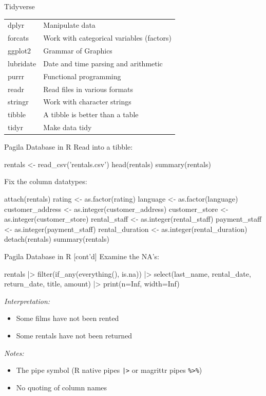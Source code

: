 \documentclass[ignorenonframetext,xcolor=x11names]{beamer}
\begin{document}
\begin{frame}{Tidyverse}
\renewcommand{\arraystretch}{1.25}
\centering

\begin{tabular}{l|l} \hline
dplyr & Manipulate data \\
forcats & Work with categorical variables (factors) \\
ggplot2 & Grammar of Graphics \\
lubridate & Date and time parsing and arithmetic \\
purrr & Functional programming \\
readr & Read files in various formats \\
stringr & Work with character strings \\
tibble & A tibble is better than a table \\
tidyr & Make data tidy \\ \hline
\end{tabular}
\end{frame}

\begin{frame}[fragile]{Pagila Database in R}
Read into a tibble:
\small
\begin{Rcode}
rentals <- read_csv('rentals.csv')
head(rentals)
summary(rentals)
\end{Rcode}
Fix the column datatypes:
\footnotesize
\begin{Rcode}
attach(rentals)
rating <- as.factor(rating)
language <- as.factor(language)
customer_address <- as.integer(customer_address)
customer_store <- as.integer(customer_store)
rental_staff <- as.integer(rental_staff)
payment_staff <- as.integer(payment_staff)
rental_duration <- as.integer(rental_duration)
detach(rentals)
summary(rentals)
\end{Rcode}
\end{frame}

\begin{frame}[fragile]{Pagila Database in R \small [cont'd]}
Examine the NA's:
\footnotesize
\begin{Rcode}
rentals |> 
  filter(if_any(everything(), is.na)) |>
  select(last_name, rental_date, return_date, 
         title, amount) |>
  print(n=Inf, width=Inf)
\end{Rcode}
\normalsize
\emph{Interpretation:}
\begin{itemize}
  \item Some films have not been rented
  \item Some rentals have not been returned
\end{itemize}
\emph{Notes:}
\begin{itemize}
  \item The pipe symbol (R native pipes \texttt{|>} or magrittr pipes \texttt{\%>\%})
  \item No quoting of column names
\end{itemize}
\end{frame}
\end{document}
